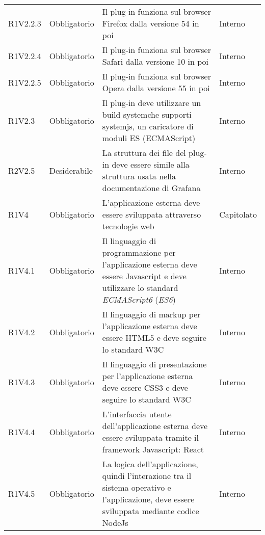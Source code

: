 \begin{longtable} {
		>{\centering}p{18mm} 
		>{\centering}p{28mm}
		>{}p{50mm} 
		>{}p{28mm}
		}
	R1V2.2.3 & 
	Obbligatorio & 
	Il plug-in funziona sul browser Firefox dalla versione 54 in poi &
	Interno  \TBstrut \\ [2mm]
	
	R1V2.2.4 & 
	Obbligatorio & 
	Il plug-in funziona sul browser Safari dalla versione 10 in poi &
	Interno  \TBstrut \\ [2mm]
	
	R1V2.2.5 & 
	Obbligatorio & 
	Il plug-in funziona sul browser Opera dalla versione 55 in poi &
	Interno  \TBstrut \\ [2mm]
	
	R1V2.3 & 
	Obbligatorio & 
	Il plug-in deve utilizzare un build system\glosp che supporti systemjs, un caricatore di moduli ES (ECMAScript) &
	Interno  \TBstrut \\ [2mm]
	
	R2V2.5 &
	Desiderabile &
	La struttura dei file del plug-in deve essere simile alla struttura usata nella documentazione di Grafana\glo &
	Interno  \TBstrut \\ [2mm]
	
	R1V4 & 
	Obbligatorio & 
	L'applicazione esterna deve essere sviluppata attraverso tecnologie web &
	Capitolato \TBstrut \\ [2mm]
	
	R1V4.1 & 
	Obbligatorio & 
	Il linguaggio di programmazione per l'applicazione esterna deve essere Javascript e deve utilizzare lo standard \textit{ECMAScript6} (\textit{ES6}) &
	Interno  \TBstrut \\ [2mm]
	
	R1V4.2 & 
	Obbligatorio & 
	Il linguaggio di markup per l'applicazione esterna deve essere HTML5 e deve seguire lo standard W3C &
	Interno  \TBstrut \\ [2mm]
	
	R1V4.3 & 
	Obbligatorio & 
	Il linguaggio di presentazione per l'applicazione esterna deve essere CSS3 e deve seguire lo standard W3C &
	Interno  \TBstrut \\ [2mm]

	R1V4.4 & 
	Obbligatorio & 
	L'interfaccia utente dell'applicazione esterna deve essere sviluppata tramite il framework Javascript: React &
	Interno  \TBstrut \\ [2mm]

	R1V4.5 & 
	Obbligatorio & 
	La logica dell'applicazione, quindi l'interazione tra il sistema operativo e l'applicazione, deve essere sviluppata mediante codice NodeJs &
	Interno  \TBstrut \\ [2mm]


\end{longtable}
